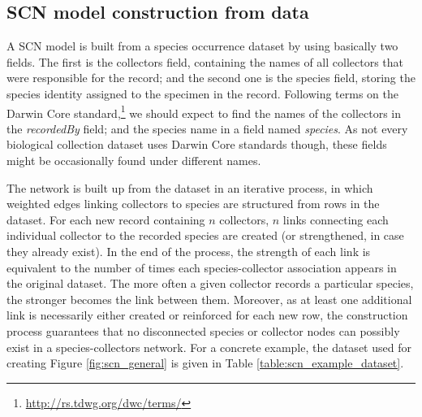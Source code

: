 {%
\subsection{SCN model construction from data}
\label{subsec:scn-model-construction}
A SCN model is built from a species occurrence dataset by using basically two fields.
The first is the collectors field, containing the names of all collectors that were responsible for the record; and the second one is the species field, storing the species identity assigned to the specimen in the record.
Following terms on the Darwin Core standard,\footnote{\url{http://rs.tdwg.org/dwc/terms/}} we should expect to find the names of the collectors in the \textit{recordedBy} field; and the species name in a field named \textit{species}. As not every biological collection dataset uses Darwin Core standards though, these fields might be occasionally found under different names.

The network is built up from the dataset in an iterative process, in which weighted edges linking collectors to species are structured from rows in the dataset.
For each new record containing $n$ collectors, $n$ links connecting each individual collector to the recorded species are created (or strengthened, in case they already exist).
In the end of the process, the strength of each link is equivalent to the number of times each species-collector association appears in the original dataset.
The more often a given collector records a particular species, the stronger becomes the link between them.
Moreover, as at least one additional link is necessarily either created or reinforced for each new row, the construction process guarantees that no disconnected species or collector nodes can possibly exist in a species-collectors network.
For a concrete example, the dataset used for creating Figure \ref{fig:scn_general} is given in Table \ref{table:scn_example_dataset}.

}
